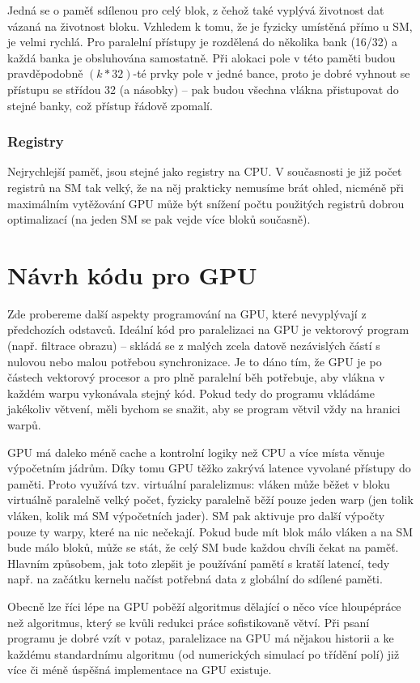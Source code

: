 Jedná se o paměť sdílenou pro celý blok, z čehož také vyplývá životnost dat vázaná na životnost bloku. Vzhledem k tomu, že je fyzicky umístěná přímo u SM, je velmi rychlá. Pro paralelní přístupy je rozdělená do několika bank (16/32) a každá banka je obsluhována samostatně. Při alokaci pole v této paměti budou pravděpodobně $(k*32)$-té prvky pole v jedné bance, proto je dobré vyhnout se přístupu se střídou 32 (a násobky) -- pak budou všechna vlákna přistupovat do stejné banky, což přístup řádově zpomalí.

\subsubsection{Registry}

Nejrychlejší paměť, jsou stejné jako registry na CPU. V současnosti je již počet registrů na SM tak velký, že na něj prakticky nemusíme brát ohled, nicméně při maximálním vytěžování GPU může být snížení počtu použitých registrů dobrou optimalizací (na jeden SM se pak vejde více bloků současně).

\section{Návrh kódu pro GPU}

Zde probereme další aspekty programování na GPU, které nevyplývají z předchozích odstavců. Ideální kód pro paralelizaci na GPU je vektorový program (např. filtrace obrazu) -- skládá se z malých zcela datově nezávislých částí s nulovou nebo malou potřebou synchronizace. Je to dáno tím, že GPU je po částech vektorový procesor a pro plně paralelní běh potřebuje, aby vlákna v každém warpu vykonávala stejný kód. Pokud tedy do programu vkládáme jakékoliv větvení, měli bychom se snažit, aby se program větvil vždy na hranici warpů.

GPU má daleko méně cache a kontrolní logiky než CPU a více místa věnuje výpočetním jádrům. Díky tomu GPU těžko zakrývá latence vyvolané přístupy do paměti. Proto využívá tzv. virtuální paralelizmus: vláken může běžet v bloku virtuálně paralelně velký počet, fyzicky paralelně běží pouze jeden warp (jen tolik vláken, kolik má SM výpočetních jader). SM pak aktivuje pro další výpočty pouze ty warpy, které na nic nečekají. Pokud bude mít blok málo vláken a na SM bude málo bloků, může se stát, že celý SM bude každou chvíli čekat na paměť. Hlavním způsobem, jak toto zlepšit je používání pamětí s kratší latencí, tedy např. na začátku kernelu načíst potřebná data z globální do sdílené paměti.

Obecně lze říci lépe na GPU poběží algoritmus dělající o něco více \bq hloupé\eq práce než algoritmus, který se kvůli redukci práce sofistikovaně větví. Při psaní programu je dobré vzít v potaz, paralelizace na GPU má nějakou historii a ke každému standardnímu algoritmu (od numerických simulací po třídění polí) již více či méně úspěšná implementace na GPU existuje.
